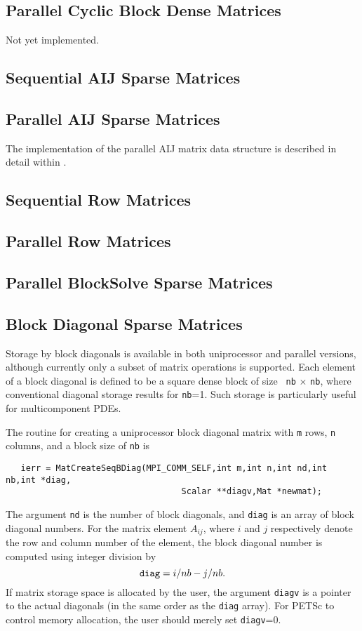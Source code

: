 \subsection{Parallel Cyclic Block Dense Matrices}
Not yet implemented.

\subsection{Sequential AIJ Sparse Matrices}

\subsection{Parallel AIJ Sparse Matrices}

The implementation of the parallel AIJ matrix data structure is 
described in detail within \cite{petsc-mpi-paper}.

\subsection{Sequential Row Matrices}

\subsection{Parallel Row Matrices}

\subsection{Parallel BlockSolve Sparse Matrices}

\subsection{Block Diagonal Sparse Matrices}

Storage  by block diagonals is
available in both uniprocessor and parallel versions, although currently
only a subset of matrix operations is supported.  Each element of
a block diagonal is defined to be a square dense block of size {\tt
nb} $\times$ {\tt nb}, where conventional diagonal storage results for
{\tt nb}=1.  Such storage is particularly useful for multicomponent PDEs.

The routine for creating a uniprocessor block diagonal matrix with {\tt m} 
rows, {\tt n} columns, and a block size of {\tt nb} is
\begin{verbatim}
   ierr = MatCreateSeqBDiag(MPI_COMM_SELF,int m,int n,int nd,int nb,int *diag,
                                   Scalar **diagv,Mat *newmat);
\end{verbatim}
The  argument {\tt nd} is the number of 
block diagonals, and {\tt diag} is
an array of block diagonal numbers.  For the matrix element $A_{ij}$,
where $i$ and $j$ respectively denote the row and column number of the 
element, the block diagonal number is computed using integer division by
\[ {\tt diag} = i/nb - j/nb. \]
If matrix storage space is allocated by the user, the argument {\tt diagv} 
is a pointer to the actual diagonals (in the same order as the {\tt diag} 
array).  For PETSc to control memory allocation, the user should merely
set {\tt diagv}=0.

